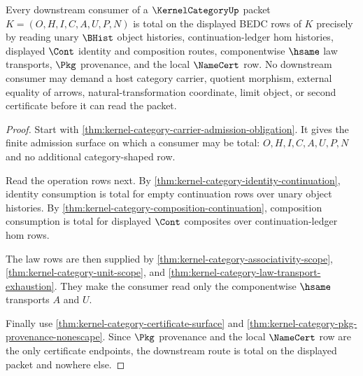 \begin{theorem}
\label{thm:kernel-category-downstream-consumer-totality}
Every downstream consumer of a $\KernelCategoryUp$ packet $K=(O,H,I,C,A,U,P,N)$ is total on the displayed BEDC rows of $K$ precisely by reading unary $\BHist$ object histories, continuation-ledger hom histories, displayed $\Cont$ identity and composition routes, componentwise $\hsame$ law transports, $\Pkg$ provenance, and the local $\NameCert$ row. No downstream consumer may demand a host category carrier, quotient morphism, external equality of arrows, natural-transformation coordinate, limit object, or second certificate before it can read the packet.
\end{theorem}
\begin{proof}
Start with \autoref{thm:kernel-category-carrier-admission-obligation}. It gives the finite admission surface on which a consumer may be total: $O,H,I,C,A,U,P,N$ and no additional category-shaped row.

Read the operation rows next. By \autoref{thm:kernel-category-identity-continuation}, identity consumption is total for empty continuation rows over unary object histories. By \autoref{thm:kernel-category-composition-continuation}, composition consumption is total for displayed $\Cont$ composites over continuation-ledger hom rows.

The law rows are then supplied by \autoref{thm:kernel-category-associativity-scope}, \autoref{thm:kernel-category-unit-scope}, and \autoref{thm:kernel-category-law-transport-exhaustion}. They make the consumer read only the componentwise $\hsame$ transports $A$ and $U$.

Finally use \autoref{thm:kernel-category-certificate-surface} and \autoref{thm:kernel-category-pkg-provenance-nonescape}. Since $\Pkg$ provenance and the local $\NameCert$ row are the only certificate endpoints, the downstream route is total on the displayed packet and nowhere else.
\end{proof}


